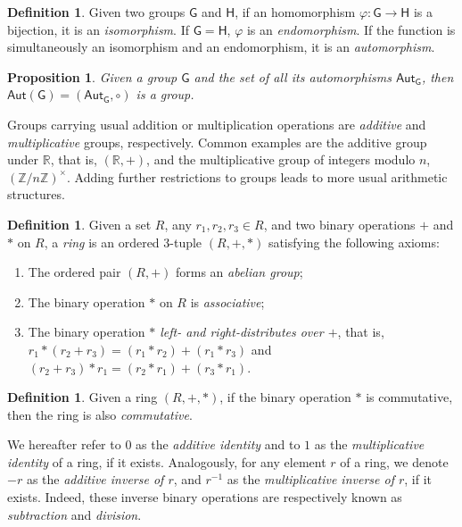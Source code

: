 \documentclass[draft, 12pt, a4paper, oneside]{memoir}
\newtheorem{proposition}[theorem]{Proposition}
\theoremstyle{definition}
\newtheorem{definition}[theorem]{Definition}
\begin{document}
\begin{definition}\label{def:morph}
  Given two groups $\mathsf{G}$ and $\mathsf{H}$, if an homomorphism $\varphi : \mathsf{G} \to \mathsf{H}$ is a bijection, it is an \emph{isomorphism}. If $\mathsf{G} = \mathsf{H}$, $\varphi$ is an \emph{endomorphism}. If the function is simultaneously an isomorphism and an endomorphism, it is an \emph{automorphism}.
\end{definition}

\begin{proposition}\label{prop:autgroup}
  Given a group $\mathsf{G}$ and the set of all its automorphisms $\mathsf{Aut}_{\mathsf{G}}$, then $\mathsf{Aut}(\mathsf{G}) = (\mathsf{Aut}_{\mathsf{G}}, \circ)$ is a group.
\end{proposition}

Groups carrying usual addition or multiplication operations are \emph{additive} and \emph{multiplicative} groups, respectively. Common examples are the additive group under $\mathbb{R}$, that is, $(\mathbb{R}, +)$, and the multiplicative group of integers modulo $n$, $(\mathbb{Z}/n\mathbb{Z})^{\times}$. Adding further restrictions to groups leads to more usual arithmetic structures.

\begin{definition}
  Given a set $R$, any $r_{1}, r_{2}, r_{3} \in R$, and two binary operations $+$ and $\ast$ on $R$, a \emph{ring} is an ordered 3-tuple $(R, +, \ast)$ satisfying the following axioms:
  
  \begin{enumerate}
    \item The ordered pair $(R, +)$ forms an \emph{abelian group};
    \item The binary operation $\ast$ on $R$ is \emph{associative};
    \item The binary operation \emph{$\ast$ left- and right-distributes over $+$}, that is, $r_{1} \ast (r_{2} + r_{3}) = (r_{1} \ast r_{2}) + (r_{1} \ast r_{3})$ and $(r_{2} + r_{3}) \ast r_{1} = (r_{2} \ast r_{1}) + (r_{3} \ast r_{1})$.
  \end{enumerate}
\end{definition}

\begin{definition}
  Given a ring $(R, +, \ast)$, if the binary operation $\ast$ is commutative, then the ring is also \emph{commutative}.
\end{definition}

We hereafter refer to $0$ as the \emph{additive identity} and to $1$ as the \emph{multiplicative identity} of a ring, if it exists. Analogously, for any element $r$ of a ring, we denote $-r$ as the \emph{additive inverse of $r$}, and $r^{-1}$ as the \emph{multiplicative inverse of $r$}, if it exists. Indeed, these inverse binary operations are respectively known as \emph{subtraction} and \emph{division}.
\end{document}
